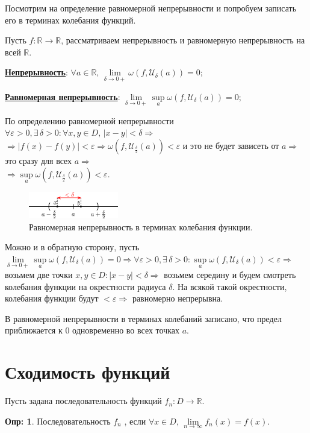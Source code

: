 \documentclass[12pt]{article}
\newcommand{\MR}{\mathbb{R}}
\newcommand{\MU}{\mathcal{U}}
\newcommand{\VE}{\varepsilon}
\theoremstyle{definition}
\newtheorem{defn}{Опр:}
\begin{document}
Посмотрим на определение равномерной непрерывности и попробуем записать его в терминах колебания функций. 

Пусть $f \colon \MR \to \MR$, рассматриваем непрерывность и равномерную непрерывность на всей $\MR$.

\uline{\textbf{Непрерывность}}: $\forall a \in \MR, \, \lim\limits_{\delta \to 0+}\omega(f,\MU_\delta(a)) = 0$;

\uline{\textbf{Равномерная непрерывность}}: $\lim\limits_{\delta \to 0+}\sup\limits_{a}\omega(f,\MU_\delta(a)) = 0$;

По определению равномерной непрерывности $\forall \VE >0, \exists \, \delta >0 \colon \forall x,y \in D, \, |x-y| < \delta \Rightarrow$ \\
$\Rightarrow |f(x)-f(y)| < \VE \Rightarrow \omega(f,\MU_\frac{\delta}{2}(a)) < \VE$ и это не будет зависеть от $a \Rightarrow$ это сразу для всех $a \Rightarrow$\\ $\Rightarrow \sup\limits_{a}\omega(f,\MU_\frac{\delta}{2}(a)) < \VE$.

\begin{figure}[H]
	\centering
	\includegraphics[width=0.35\textwidth]{20_5.eps}
	\caption{Равномерная непрерывность в терминах колебания функции.}
	\label{20_5}
\end{figure}

Можно и в обратную сторону, пусть $\lim\limits_{\delta \to 0+}\sup\limits_{a}\omega(f,\MU_\delta(a)) = 0 \Rightarrow \forall \VE > 0, \exists \, \delta > 0 \colon \sup\limits_{a}\omega(f,\MU_\delta(a)) < \VE \Rightarrow$ возьмем две точки $x,y \in D \colon |x-y| < \delta \Rightarrow$ возьмем середину и будем смотреть колебания функции на окрестности радиуса $\delta$. На всякой такой окрестности, колебания функции будут $<\VE \Rightarrow$ равномерно непрерывна.

В равномерной непрерывности в терминах колебаний записано, что предел приближается к $0$ одновременно во всех точках $a$.

\newpage

\section*{Сходимость функций}

Пусть задана последовательность функций $f_n \colon D \to \MR$.
\begin{defn}
	Последовательность $f_n$ , если $\forall x \in D, \, \lim\limits_{n \to \infty}f_n(x) =f(x)$.
\end{defn}
\end{document}
